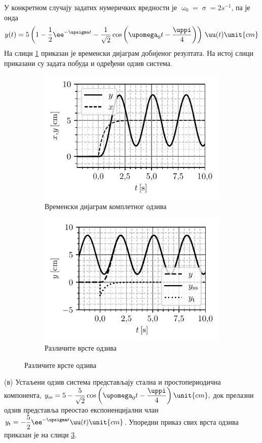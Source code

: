 У конкретном случају задатих нумеричких вредности је  
$\upomega_0 = \upsigma = 2\unit{s^{-1}}$, па је онда 
\begin{equation}
    y(t) = 5 \left( 1 - \dfrac{1}{2} \ee^{-\upsigma t} - \dfrac{1}{\sqrt 2} \cos\left(\upomega_0 t - \dfrac{\uppi}{4} \right) \right) \, \uu(t) \unit{cm}
\end{equation}
На слици \ref{fig:\ID.rez} приказан је временски дијаграм добијеног резултата. На истој слици приказани су 
задата побуда и одређени одзив система.

\begin{figure}[ht!]
    \centering
    \begin{subfigure}{0.49\textwidth}
        \includegraphics{fig/cim_rez_plot.pdf}
        \caption{Временски дијаграм комплетног одзива}
        \label{fig:\ID.rez}    
    \end{subfigure}
    \begin{subfigure}{0.49\textwidth}
        \includegraphics{fig/cim_rez_razni_plot.pdf}
        \caption{Различите врсте одзива}
        \label{fig:\ID.rez2}    
    \end{subfigure}
\end{figure}

(в) Устаљени одзив система представљају стална и простопериодична компонента, 
$y_{\rm ss} = 5 - \dfrac{5}{\sqrt 2} \cos\left(\upomega_0 t - \dfrac{\uppi}{4} \right) \unit{cm},$ док 
прелазни одзив представља преостао експоненцијални члан 
$y_{\rm t} = - \dfrac{5}{2} \ee^{-\upsigma t} \uu(t) \unit{cm}$. Упоредни приказ свих врста одзива 
приказан је на слици \ref{fig:\ID.rez2}.